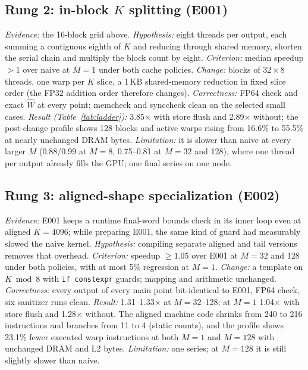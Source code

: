 \documentclass[sigconf,nonacm]{acmart}
\begin{document}
\subsection{Rung 2: in-block $K$ splitting (E001)}
\emph{Evidence:} the 16-block grid above. \emph{Hypothesis:} eight threads per output, each summing a contiguous eighth of $K$ and reducing through shared memory, shorten the serial chain and multiply the block count by eight. \emph{Criterion:} median speedup $>1$ over naive at $M=1$ under both cache policies. \emph{Change:} blocks of $32\times 8$ threads, one warp per $K$ slice, a 1\,KB shared-memory reduction in fixed slice order (the FP32 addition order therefore changes). \emph{Correctness:} FP64 check and exact $\hat W$ at every point; memcheck and synccheck clean on the selected small cases. \emph{Result (Table~\ref{tab:ladder}):} 3.85$\times$ with store flush and 2.89$\times$ without; the post-change profile shows 128 blocks and active warps rising from 16.6\% to 55.5\% at nearly unchanged DRAM bytes. \emph{Limitation:} it is slower than naive at every larger $M$ (0.88/0.99 at $M=8$, 0.75--0.81 at $M=32$ and 128), where one thread per output already fills the GPU; one final series on one node.

\subsection{Rung 3: aligned-shape specialization (E002)}
\emph{Evidence:} E001 keeps a runtime final-word bounds check in its inner loop even at aligned $K=4096$; while preparing E001, the same kind of guard had measurably slowed the naive kernel. \emph{Hypothesis:} compiling separate aligned and tail versions removes that overhead. \emph{Criterion:} speedup $\ge 1.05$ over E001 at $M=32$ and 128 under both policies, with at most 5\% regression at $M=1$. \emph{Change:} a template on $K \bmod 8$ with \texttt{if constexpr} guards; mapping and arithmetic unchanged. \emph{Correctness:} every output of every main point bit-identical to E001, FP64 check, six sanitizer runs clean. \emph{Result:} 1.31--1.33$\times$ at $M=32$--128; at $M=1$ 1.04$\times$ with store flush and 1.28$\times$ without. The aligned machine code shrinks from 240 to 216 instructions and branches from 11 to 4 (static counts), and the profile shows 23.1\% fewer executed warp instructions at both $M=1$ and $M=128$ with unchanged DRAM and L2 bytes. \emph{Limitation:} one series; at $M=128$ it is still slightly slower than naive.
\end{document}
